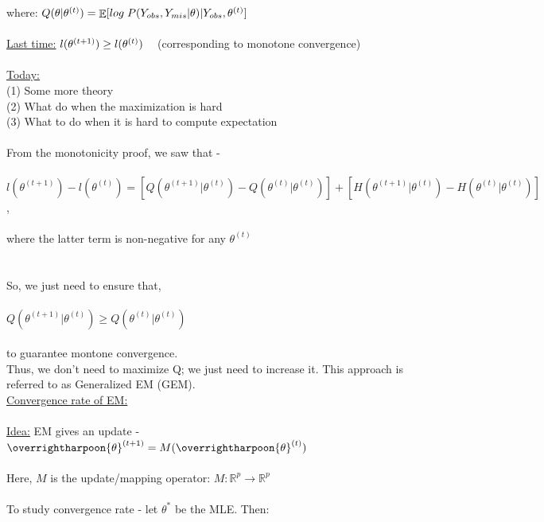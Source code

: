 \documentclass[12pt]{article}
\newcommand{\R}{\mathbb{R}}
\DeclareMathOperator*{\E}{\mathbb{E}}
\begin{document}
where: $Q(\theta|\theta^{(t)})= \E[log\hspace{1 mm} P(Y_{obs}, Y_{mis}|\theta)|Y_{obs}, \theta^{(t)}]$
\\
\\
\uline{Last time:} \hspace{2 mm} $l(\theta^{(t+1)})\geq l(\theta^{(t)})\hspace{3 mm}$ (corresponding to monotone convergence)
\\
\\
\uline{Today:}\\
(1) Some more theory\\
(2) What do when the maximization is hard\\
(3) What to do when it is hard to compute expectation\\
\\
From the monotonicity proof, we saw that - \\
\\
$l(\theta^{(t+1)})-l(\theta^{(t)}) = [Q(\theta^{(t+1)}|\theta^{(t)})-Q(\theta^{(t)}|\theta^{(t)})] + [H(\theta^{(t+1)}|\theta^{(t)})-H(\theta^{(t)}|\theta^{(t)})]$,\\
\\
where the latter term is non-negative for any $\theta^{(t)}$\\
\\
\\
So, we just need to ensure that,\\
\\
$Q(\theta^{(t+1)}|\theta^{(t)})\geq Q(\theta^{(t)}|\theta^{(t)})$\\
\\
to guarantee montone convergence.  \\
Thus, we don't need to maximize Q; we just need to increase it.  This approach is referred to as Generalized EM (GEM).\\
\newpage
\-\hspace{6 cm} \uline{Convergence rate of EM:}\\
\\
\uline{Idea:} EM gives an update - \hspace{2 mm} $\overrightharpoon{\theta}^{(t+1)}=M(\overrightharpoon{\theta}^{(t)})$\\
\\
Here, $M$ is the update/mapping operator:  $M:\R^p\rightarrow\R^p$\\
\\
To study convergence rate - let $\theta^*$ be the MLE.  Then:\\
\end{document}
